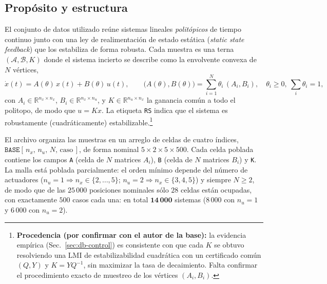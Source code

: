 \subsection{Propósito y estructura}

El conjunto de datos utilizado reúne sistemas lineales
\emph{politópicos} de tiempo continuo junto con una ley de realimentación de
estado estática (\emph{static state feedback}) que los estabiliza de forma
robusta. Cada muestra es una terna $(\mathcal{A},\mathcal{B},K)$ donde el sistema
incierto se describe como la envolvente convexa de $N$ vértices,
%
\begin{equation}
  \dot{x}(t) = A(\theta)\,x(t) + B(\theta)\,u(t),
  \qquad
  \bigl(A(\theta),B(\theta)\bigr)=\sum_{i=1}^{N}\theta_i\,(A_i,B_i),
  \quad \theta_i\ge 0,\ \textstyle\sum_i\theta_i=1,
  \label{eq:politopo}
\end{equation}
%
con $A_i\in\mathbb{R}^{n_x\times n_x}$, $B_i\in\mathbb{R}^{n_x\times n_u}$, y
$K\in\mathbb{R}^{n_u\times n_x}$ la ganancia común a todo el politopo, de modo
que $u=Kx$. La etiqueta \texttt{RS} indica que el sistema es robustamente (cuadráticamente)
estabilizable.\footnote{\textbf{Procedencia (por confirmar con el autor de la base):}
la evidencia empírica (Sec.~\ref{sec:db-control}) es consistente con que cada $K$
se obtuvo resolviendo una LMI de estabilizabilidad cuadrática con un certificado
común $(Q,Y)$ y $K=YQ^{-1}$, sin maximizar la tasa de decaimiento. Falta confirmar
el procedimiento exacto de muestreo de los vértices $(A_i,B_i)$.}

El archivo organiza las muestras en un arreglo de celdas de cuatro índices,
$\texttt{BASE}[\,n_x,\,n_u,\,N,\,\text{caso}\,]$, de forma nominal
$5\times 2\times 5\times 500$. Cada celda poblada contiene los campos
\texttt{A} (celda de $N$ matrices $A_i$), \texttt{B} (celda de $N$ matrices $B_i$)
y \texttt{K}. La malla está poblada parcialmente: el orden mínimo depende del
número de actuadores ($n_u{=}1\Rightarrow n_x\in\{2,\dots,5\}$;
$n_u{=}2\Rightarrow n_x\in\{3,4,5\}$) y siempre $N\ge 2$, de modo que de las
$25\,000$ posiciones nominales sólo $28$ celdas están ocupadas, con
exactamente $500$ casos cada una: en total $\mathbf{14\,000}$ sistemas
($8\,000$ con $n_u{=}1$ y $6\,000$ con $n_u{=}2$).

